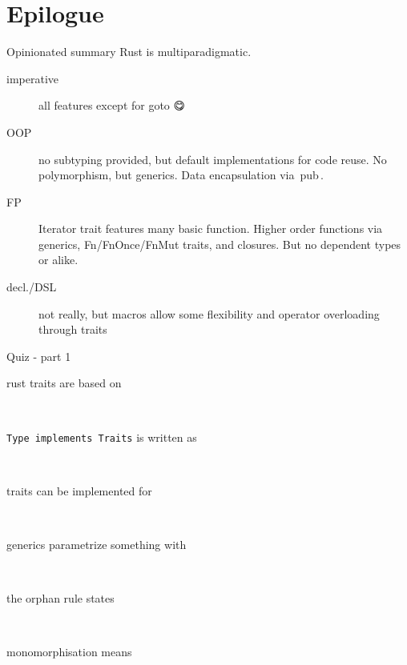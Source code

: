 \documentclass{beamer}
\newcommand\code[1]{\,{\color[HTML]{884400}#1}\,}
\begin{document}
\section{Epilogue}

\begin{frame}[fragile]{Opinionated summary}
  Rust is multiparadigmatic.
  \begin{description}
    \item[imperative] all features except for goto 😋
    \item[OOP] no subtyping provided, but default implementations for code reuse. No polymorphism, but generics. Data encapsulation via \code{pub}.
    \item[FP] Iterator trait features many basic function. Higher order functions via generics, Fn/FnOnce/FnMut traits, and closures. But no dependent types or alike.
    \item[decl./DSL] not really, but macros allow some flexibility and operator overloading through traits
  \end{description}
\end{frame}

\begin{frame}[fragile]{Quiz - part 1}
  \begin{description}
    \item[rust traits are based on] ~
    \item[\texttt{Type implements Traits} is written as] ~
    \item[traits can be implemented for] ~
    \item[generics parametrize something with] ~
    \item[the orphan rule states] ~
    \item[monomorphisation means] ~
  \end{description}
\end{frame}
\end{document}
